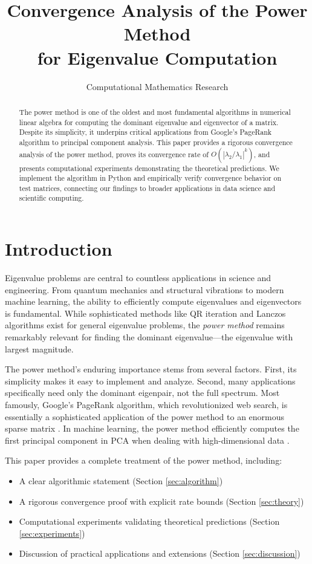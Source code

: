 \documentclass[11pt,a4paper]{article}
\title{\textbf{Convergence Analysis of the Power Method\\for Eigenvalue Computation}}
\author{Computational Mathematics Research}
\date{}
\begin{document}
\maketitle

\begin{abstract}
The power method is one of the oldest and most fundamental algorithms in numerical linear algebra for computing the dominant eigenvalue and eigenvector of a matrix. Despite its simplicity, it underpins critical applications from Google's PageRank algorithm to principal component analysis. This paper provides a rigorous convergence analysis of the power method, proves its convergence rate of $O(|\lambda_2/\lambda_1|^k)$, and presents computational experiments demonstrating the theoretical predictions. We implement the algorithm in Python and empirically verify convergence behavior on test matrices, connecting our findings to broader applications in data science and scientific computing.
\end{abstract}

\section{Introduction}

Eigenvalue problems are central to countless applications in science and engineering. From quantum mechanics and structural vibrations to modern machine learning, the ability to efficiently compute eigenvalues and eigenvectors is fundamental. While sophisticated methods like QR iteration and Lanczos algorithms exist for general eigenvalue problems, the \emph{power method} remains remarkably relevant for finding the dominant eigenvalue---the eigenvalue with largest magnitude.

The power method's enduring importance stems from several factors. First, its simplicity makes it easy to implement and analyze. Second, many applications specifically need only the dominant eigenpair, not the full spectrum. Most famously, Google's PageRank algorithm, which revolutionized web search, is essentially a sophisticated application of the power method to an enormous sparse matrix \cite{pagerank}. In machine learning, the power method efficiently computes the first principal component in PCA when dealing with high-dimensional data \cite{golub2013}.

This paper provides a complete treatment of the power method, including:
\begin{itemize}
    \item A clear algorithmic statement (Section \ref{sec:algorithm})
    \item A rigorous convergence proof with explicit rate bounds (Section \ref{sec:theory})
    \item Computational experiments validating theoretical predictions (Section \ref{sec:experiments})
    \item Discussion of practical applications and extensions (Section \ref{sec:discussion})
\end{itemize}
\end{document}
